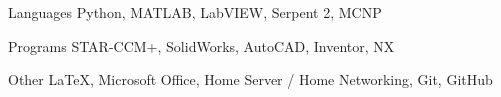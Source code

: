 
\begin{cvskills}
  \cvskill
    {Languages} %
    {Python, MATLAB, LabVIEW, Serpent 2, MCNP} %

  \cvskill
    {Programs} %
    {STAR-CCM+, SolidWorks, AutoCAD, Inventor, NX} %
    
  \cvskill
    {Other} %
    {\LaTeX, Microsoft Office, Home Server / Home Networking, Git, GitHub} %
\end{cvskills}
